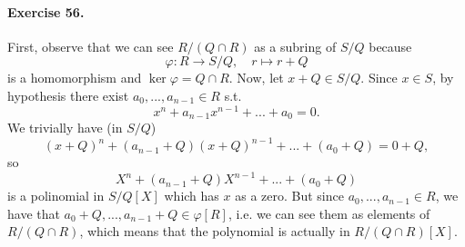 \documentclass[12pt,a4paper]{report}
\theoremstyle{definition}
\theoremstyle{num.custom-title}
\renewcommand{\phi}{\varphi}
\begin{document}
\paragraph{Exercise 56.} First, observe that we can see $R/(Q \cap R)$ as a subring of $S/Q$ because
\[
\phi: R \to S/Q, \quad r \mapsto r+Q
\]
is a homomorphism and $\ker \phi = Q \cap R$. Now, let $x+Q \in S/Q$. Since $x \in S$, by hypothesis there exist $a_0,...,a_{n-1} \in R$ s.t.
\[
x^n + a_{n-1}x^{n-1}+ ... + a_0 = 0.
\]
We trivially have (in $S/Q$)
\[
(x+Q)^n + (a_{n-1} + Q)(x+Q)^{n-1} + ... + (a_0 + Q) = 0+Q,
\]
so
\[
X^n + (a_{n-1} + Q)X^{n-1} + ... + (a_0 + Q)
\]
is a polinomial in $S/Q[X]$ which has $x$ as a zero. But since $a_0,...,a_{n-1} \in R$, we have that $a_0+Q,...,a_{n-1}+Q \in \phi[R]$, i.e. we can see them as elements of $R/(Q \cap R)$, which means that the polynomial is actually in $R/(Q \cap R)[X]$.
\end{document}
